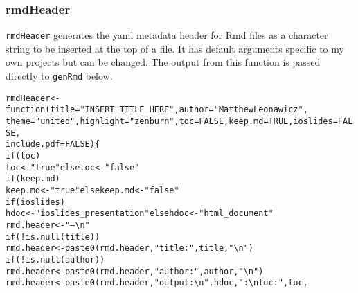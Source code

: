\documentclass{article}\usepackage[]{graphicx}\usepackage[]{color}
\makeatletter
\newcommand{\hlnum}[1]{\textcolor[rgb]{0.863,0.196,0.184}{#1}}%
\newcommand{\hlstr}[1]{\textcolor[rgb]{0.863,0.196,0.184}{#1}}%
\newcommand{\hlopt}[1]{\textcolor[rgb]{0.576,0.631,0.631}{#1}}%
\newcommand{\hlstd}[1]{\textcolor[rgb]{0.514,0.58,0.588}{#1}}%
\newcommand{\hlkwa}[1]{\textcolor[rgb]{0.796,0.294,0.086}{#1}}%
\newcommand{\hlkwb}[1]{\textcolor[rgb]{0.522,0.6,0}{#1}}%
\newcommand{\hlkwc}[1]{\textcolor[rgb]{0.796,0.294,0.086}{#1}}%
\newcommand{\hlkwd}[1]{\textcolor[rgb]{0.576,0.631,0.631}{#1}}%
\newenvironment{kframe}{%
 \def\at@end@of@kframe{}%
 \ifinner\ifhmode%
  \def\at@end@of@kframe{\end{minipage}}%
  \begin{minipage}{\columnwidth}%
 \fi\fi%
 \def\FrameCommand##1{\hskip\@totalleftmargin \hskip-\fboxsep
 \colorbox{shadecolor}{##1}\hskip-\fboxsep
     \hskip-\linewidth \hskip-\@totalleftmargin \hskip\columnwidth}%
 \MakeFramed {\advance\hsize-\width
   \@totalleftmargin\z@ \linewidth\hsize
   \@setminipage}}%
 {\par\unskip\endMakeFramed%
 \at@end@of@kframe}
\newenvironment{knitrout}{}{} %
\makeatother
\begin{document}
\title{}
\author{}
\maketitle





\subsubsection{rmdHeader}
\texttt{rmdHeader} generates the yaml metadata header for Rmd files as a character string to be inserted at the top of a file.
It has default arguments specific to my own projects but can be changed.
The output from this function is passed directly to \texttt{genRmd} below.

\begin{knitrout}
\color{fgcolor}\begin{kframe}
\begin{alltt}
\hlstd{rmdHeader} \hlkwb{<-} \hlkwa{function}\hlstd{(}\hlkwc{title} \hlstd{=} \hlstr{"INSERT_TITLE_HERE"}\hlstd{,} \hlkwc{author} \hlstd{=} \hlstr{"Matthew Leonawicz"}\hlstd{,}
    \hlkwc{theme} \hlstd{=} \hlstr{"united"}\hlstd{,} \hlkwc{highlight} \hlstd{=} \hlstr{"zenburn"}\hlstd{,} \hlkwc{toc} \hlstd{=} \hlnum{FALSE}\hlstd{,} \hlkwc{keep.md} \hlstd{=} \hlnum{TRUE}\hlstd{,} \hlkwc{ioslides} \hlstd{=} \hlnum{FALSE}\hlstd{,}
    \hlkwc{include.pdf} \hlstd{=} \hlnum{FALSE}\hlstd{) \{}
    \hlkwa{if} \hlstd{(toc)}
        \hlstd{toc} \hlkwb{<-} \hlstr{"true"} \hlkwa{else} \hlstd{toc} \hlkwb{<-} \hlstr{"false"}
    \hlkwa{if} \hlstd{(keep.md)}
        \hlstd{keep.md} \hlkwb{<-} \hlstr{"true"} \hlkwa{else} \hlstd{keep.md} \hlkwb{<-} \hlstr{"false"}
    \hlkwa{if} \hlstd{(ioslides)}
        \hlstd{hdoc} \hlkwb{<-} \hlstr{"ioslides_presentation"} \hlkwa{else} \hlstd{hdoc} \hlkwb{<-} \hlstr{"html_document"}
    \hlstd{rmd.header} \hlkwb{<-} \hlstr{"---\textbackslash{}n"}
    \hlkwa{if} \hlstd{(}\hlopt{!}\hlkwd{is.null}\hlstd{(title))}
        \hlstd{rmd.header} \hlkwb{<-} \hlkwd{paste0}\hlstd{(rmd.header,} \hlstr{"title: "}\hlstd{, title,} \hlstr{"\textbackslash{}n"}\hlstd{)}
    \hlkwa{if} \hlstd{(}\hlopt{!}\hlkwd{is.null}\hlstd{(author))}
        \hlstd{rmd.header} \hlkwb{<-} \hlkwd{paste0}\hlstd{(rmd.header,} \hlstr{"author: "}\hlstd{, author,} \hlstr{"\textbackslash{}n"}\hlstd{)}
    \hlstd{rmd.header} \hlkwb{<-} \hlkwd{paste0}\hlstd{(rmd.header,} \hlstr{"output:\textbackslash{}n  "}\hlstd{, hdoc,} \hlstr{":\textbackslash{}n    toc: "}\hlstd{, toc,}

\end{alltt}
\end{kframe}
\end{knitrout}
\end{document}
